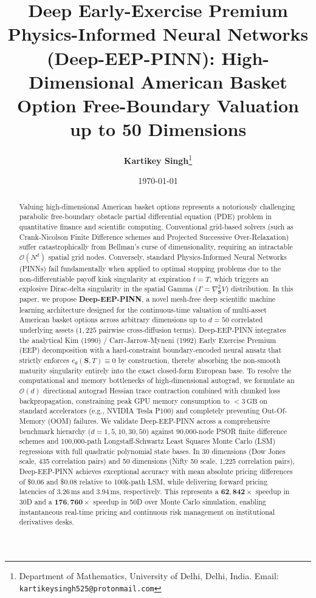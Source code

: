 \documentclass[11pt,a4paper]{article}
\title{\textbf{Deep Early-Exercise Premium Physics-Informed Neural Networks (Deep-EEP-PINN): High-Dimensional American Basket Option Free-Boundary Valuation up to 50 Dimensions}}
\author{
    \textbf{Kartikey Singh}\thanks{Department of Mathematics, University of Delhi, Delhi, India. Email: \texttt{kartikeysingh525@protonmail.com}}
}
\date{\today}
\begin{document}
\maketitle

\begin{abstract}
Valuing high-dimensional American basket options represents a notoriously challenging parabolic free-boundary obstacle partial differential equation (PDE) problem in quantitative finance and scientific computing. Conventional grid-based solvers (such as Crank-Nicolson Finite Difference schemes and Projected Successive Over-Relaxation) suffer catastrophically from Bellman's curse of dimensionality, requiring an intractable $\mathcal{O}(N^d)$ spatial grid nodes. Conversely, standard Physics-Informed Neural Networks (PINNs) fail fundamentally when applied to optimal stopping problems due to the non-differentiable payoff kink singularity at expiration $t=T$, which triggers an explosive Dirac-delta singularity in the spatial Gamma ($\Gamma = \nabla^2_{\mathbf{S}} V$) distribution. In this paper, we propose \textbf{Deep-EEP-PINN}, a novel mesh-free deep scientific machine learning architecture designed for the continuous-time valuation of multi-asset American basket options across arbitrary dimensions up to $d=50$ correlated underlying assets ($1,225$ pairwise cross-diffusion terms). Deep-EEP-PINN integrates the analytical Kim (1990) / Carr-Jarrow-Myneni (1992) Early Exercise Premium (EEP) decomposition with a hard-constraint boundary-encoded neural ansatz that strictly enforces $e_\theta(\mathbf{S}, T) \equiv 0$ by construction, thereby absorbing the non-smooth maturity singularity entirely into the exact closed-form European base. To resolve the computational and memory bottlenecks of high-dimensional autograd, we formulate an $\mathcal{O}(d)$ directional autograd Hessian trace contraction combined with chunked loss backpropagation, constraining peak GPU memory consumption to $< 3\,\text{GB}$ on standard accelerators (e.g., NVIDIA Tesla P100) and completely preventing Out-Of-Memory (OOM) failures. We validate Deep-EEP-PINN across a comprehensive benchmark hierarchy ($d=1, 5, 10, 30, 50$) against 90,000-node PSOR finite difference schemes and 100,000-path Longstaff-Schwartz Least Squares Monte Carlo (LSM) regressions with full quadratic polynomial state bases. In 30 dimensions (Dow Jones scale, 435 correlation pairs) and 50 dimensions (Nifty 50 scale, 1,225 correlation pairs), Deep-EEP-PINN achieves exceptional accuracy with mean absolute pricing differences of \$0.06 and \$0.08 relative to 100k-path LSM, while delivering forward pricing latencies of $3.26\,\text{ms}$ and $3.94\,\text{ms}$, respectively. This represents a $\mathbf{62,842\times}$ speedup in 30D and a $\mathbf{176,760\times}$ speedup in 50D over Monte Carlo simulation, enabling instantaneous real-time pricing and continuous risk management on institutional derivatives desks.
\end{abstract}
\end{document}
